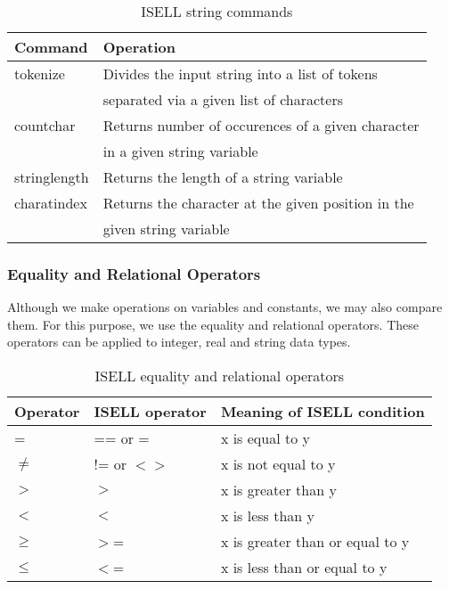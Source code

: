 \documentclass[a4paper,12pt]{book}
\begin{document}
\begin{table}[h!]
\begin{center}
\caption{ISELL string commands}
\begin{tabular}{ll}
\hline
Command & Operation \\
\hline
tokenize & Divides the input string into a list of tokens  \\
         & separated via a given list of characters \\
countchar & Returns number of occurences of a given character \\
          & in a given string variable \\
stringlength & Returns the length of a string variable \\
charatindex & Returns the character at the given position in the \\
            & given string variable \\
\hline
\end{tabular}
\label{table_string_commands}
\end{center}
\end{table}

\subsubsection{Equality and Relational Operators}

Although we make operations on variables and constants, we may also compare them. For this purpose, we use the equality and relational operators. These operators can be applied to integer, real and string data types. 
\begin{table}[h!]
\begin{center}
\caption{ISELL equality and relational operators}
\begin{tabular}{lll}
\hline
Operator & ISELL operator  & Meaning of ISELL condition \\
\hline
= & == or =  & x is equal to y \\
$\neq$ & != or $<>$ & x is not equal to y \\
$>$ & $>$ & x is greater than y \\
$<$ & $<$ &  x is less than y \\
$\geq$ & $>$=  & x is greater than or equal to y \\
$\leq$ & $<$=  & x is less than or equal to y \\
\hline
\end{tabular}
\label{table_relational_operators}
\end{center}
\end{table}
\end{document}
